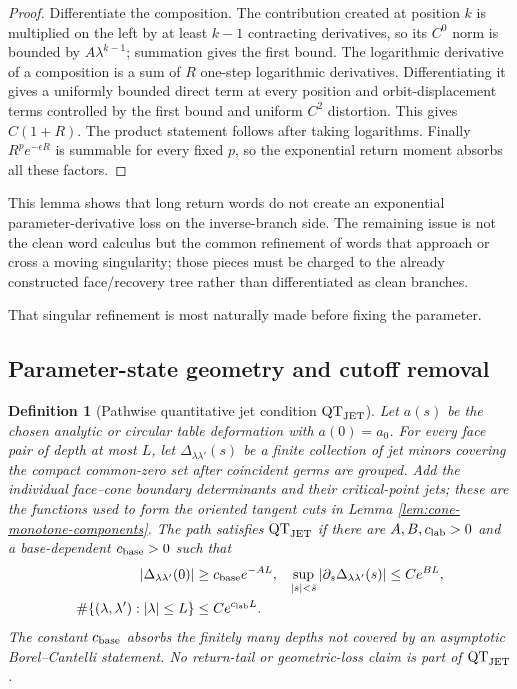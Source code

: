 \documentclass[11pt]{article}
\newtheorem{definition}[theorem]{Definition}
\begin{document}
\begin{proof}
Differentiate the composition.  The contribution created at position $k$ is
multiplied on the left by at least $k-1$ contracting derivatives, so its
$C^0$ norm is bounded by $A\lambda^{k-1}$; summation gives the first bound.
The logarithmic derivative of a composition is a sum of $R$ one-step
logarithmic derivatives.  Differentiating it gives a uniformly bounded direct
term at every position and orbit-displacement terms controlled by the first
bound and uniform $C^2$ distortion.  This gives $C(1+R)$.  The product
statement follows after taking logarithms.  Finally
$R^p e^{-\epsilon R}$ is summable for every fixed $p$, so the exponential
return moment absorbs all these factors.
\end{proof}

This lemma shows that long return words do not create an exponential
parameter-derivative loss on the inverse-branch side.  The remaining issue is
not the clean word calculus but the common refinement of words that approach
or cross a moving singularity; those pieces must be charged to the already
constructed face/recovery tree rather than differentiated as clean branches.

That singular refinement is most naturally made before fixing the parameter.

\subsection{Parameter-state geometry and cutoff removal}
\label{sec:parameter-state}

\begin{definition}[Pathwise quantitative jet condition
$\mathrm{QT}_{\rm JET}$]
\label{def:quantitative-circular-jets}
Let $a(s)$ be the chosen analytic or circular table deformation with
$a(0)=a_0$.  For every face pair of depth at most $L$, let
$\Delta_{\lambda\lambda'}(s)$ be a finite collection of jet minors covering
the compact common-zero set after coincident germs are grouped.  Add the
individual face--cone boundary determinants and their critical-point jets;
these are the functions used to form the oriented tangent cuts in Lemma
\ref{lem:cone-monotone-components}.  The path satisfies
$\mathrm{QT}_{\rm JET}$ if there are $A,B,c_{\rm lab}>0$ and a
base-dependent $c_{\rm base}>0$ such that
\begin{align}
 |\Delta_{\lambda\lambda'}(0)|&\ge c_{\rm base}e^{-AL},
 &\sup_{|s|<\bar s}|\partial_s\Delta_{\lambda\lambda'}(s)|&\le Ce^{BL},
 \label{eq:pathwise-minor-bounds}\\
 \#\{(\lambda,\lambda'):|\lambda|\le L\}&\le Ce^{c_{\rm lab}L}.
 \label{eq:pathwise-label-count}
\end{align}
The constant $c_{\rm base}$ absorbs the finitely many depths not covered by
an asymptotic Borel--Cantelli statement.  No return-tail or geometric-loss
claim is part of $\mathrm{QT}_{\rm JET}$.
\end{definition}
\end{document}
